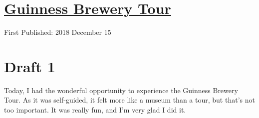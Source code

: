 \documentclass[12pt]{article}[titlepage]
\newcommand{\1}{\={a}}
\newcommand{\2}{\={e}}
\newcommand{\3}{\={\i}}
\newcommand{\4}{\=o}
\newcommand{\5}{\=u}
\newcommand{\6}{\={A}}
\renewcommand{\,}{\textsuperscript{,}}
\begin{document}
\doublespacing
\section{\href{guinness-brewery.html}{Guinness Brewery Tour}}
First Published: 2018 December 15
\section{Draft 1}
Today, I had the wonderful opportunity to experience the Guinness Brewery Tour.
As it was self-guided, it felt more like a museum than a tour, but that's not too important.
It was really fun, and I'm very glad I did it.
\end{document}
